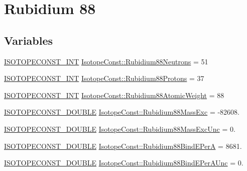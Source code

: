 \hypertarget{group___isotope_const-_rubidium-_rb88}{}\section{Rubidium 88}
\label{group___isotope_const-_rubidium-_rb88}
\subsection*{Variables}
\begin{DoxyCompactItemize}
\item 
\mbox{\hyperlink{group___isotope_const-_macros_ga5f18360b3e99483a35c32d789e62621c}{I\+S\+O\+T\+O\+P\+E\+C\+O\+N\+S\+T\+\_\+\+I\+NT}} \mbox{\hyperlink{group___isotope_const-_rubidium-_rb88_gae39fb9f0225f8bfda69e42bc31b71bb5}{Isotope\+Const\+::\+Rubidium88\+Neutrons}} = 51
\item 
\mbox{\hyperlink{group___isotope_const-_macros_ga5f18360b3e99483a35c32d789e62621c}{I\+S\+O\+T\+O\+P\+E\+C\+O\+N\+S\+T\+\_\+\+I\+NT}} \mbox{\hyperlink{group___isotope_const-_rubidium-_rb88_gaaf1da6d5dd096a270d38a91657e4d3d6}{Isotope\+Const\+::\+Rubidium88\+Protons}} = 37
\item 
\mbox{\hyperlink{group___isotope_const-_macros_ga5f18360b3e99483a35c32d789e62621c}{I\+S\+O\+T\+O\+P\+E\+C\+O\+N\+S\+T\+\_\+\+I\+NT}} \mbox{\hyperlink{group___isotope_const-_rubidium-_rb88_ga3e1db3d5526b482489c0dae3ea308647}{Isotope\+Const\+::\+Rubidium88\+Atomic\+Weight}} = 88
\item 
\mbox{\hyperlink{group___isotope_const-_macros_ga8f45a7272ce02c0b4c65c44636ed719a}{I\+S\+O\+T\+O\+P\+E\+C\+O\+N\+S\+T\+\_\+\+D\+O\+U\+B\+LE}} \mbox{\hyperlink{group___isotope_const-_rubidium-_rb88_ga2205cf4994774142b411859c5a6ce958}{Isotope\+Const\+::\+Rubidium88\+Mass\+Exc}} = -\/82608.
\item 
\mbox{\hyperlink{group___isotope_const-_macros_ga8f45a7272ce02c0b4c65c44636ed719a}{I\+S\+O\+T\+O\+P\+E\+C\+O\+N\+S\+T\+\_\+\+D\+O\+U\+B\+LE}} \mbox{\hyperlink{group___isotope_const-_rubidium-_rb88_gab5b4daf3ad05211e0a37947fff981137}{Isotope\+Const\+::\+Rubidium88\+Mass\+Exc\+Unc}} = 0.
\item 
\mbox{\hyperlink{group___isotope_const-_macros_ga8f45a7272ce02c0b4c65c44636ed719a}{I\+S\+O\+T\+O\+P\+E\+C\+O\+N\+S\+T\+\_\+\+D\+O\+U\+B\+LE}} \mbox{\hyperlink{group___isotope_const-_rubidium-_rb88_ga078c6e62807dda090f2351c4485bcf41}{Isotope\+Const\+::\+Rubidium88\+Bind\+E\+PerA}} = 8681.
\item 
\mbox{\hyperlink{group___isotope_const-_macros_ga8f45a7272ce02c0b4c65c44636ed719a}{I\+S\+O\+T\+O\+P\+E\+C\+O\+N\+S\+T\+\_\+\+D\+O\+U\+B\+LE}} \mbox{\hyperlink{group___isotope_const-_rubidium-_rb88_gaab443bec81d9abc9914c2dbafef47fb5}{Isotope\+Const\+::\+Rubidium88\+Bind\+E\+Per\+A\+Unc}} = 0.

\end{DoxyCompactItemize}

